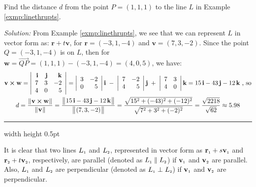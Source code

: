 \begin{exmp}
 Find the distance $d$ from the point $P = (1,1,1)$ to the line $L$ in Example \ref{exmp:linethrupts}.\vspace{1mm}
 \par\noindent\emph{Solution:} From Example \ref{exmp:linethrupts}, we see that we can represent $L$ in vector form as:
 $\textbf{r} + t \textbf{v}$, for $\textbf{r} = (-3,1,-4)$ and $\textbf{v} = (7,3,-2)$. Since the point $Q = (-3,1,-4)$
 is on $L$, then for $\textbf{w} = \overrightarrow{QP} = (1,1,1) - (-3,1,-4) = (4,0,5)$, we have:
 \begin{gather*}
  \textbf{v} \bm{\times} \textbf{w} = \left|\begin{array}{rrr}\textbf{i} & \textbf{j} & \textbf{k}\\7 & 3 & -2\\
   4 & 0 & 5\end{array}\right|
   = \left|\begin{array}{rr}3 & -2\\0 & 5\end{array}\right| \textbf{i} \;-\;
     \left|\begin{array}{rr}7 & -2\\4 & 5\end{array}\right| \textbf{j} \;+\;
     \left|\begin{array}{rr}7 & 3\\4 & 0\end{array}\right| \textbf{k}
   = 15\,\textbf{i} - 43\,\textbf{j} - 12\,\textbf{k} \text{~,~so}\\
  d = \frac{\lVert\mspace{1mu}\textbf{v} \bm{\times} \textbf{w}\mspace{1mu}\rVert}{\lVert\mspace{1mu}\textbf{v}\mspace{1mu}\rVert} =
   \frac{\bigl\lVert\mspace{1mu}15\,\textbf{i} - 43\,\textbf{j} - 12\,\textbf{k}\mspace{1mu}\bigr\rVert}{\bigl\lVert\mspace{1mu}(7,3,-2)\mspace{1mu}\bigr\rVert}
  = \frac{\sqrt{15^2 + (-43)^2 + (-12)^2}}{\sqrt{7^2 + 3^2 + (-2)^2}}
  = \frac{\sqrt{2218}}{\sqrt{62}} \approx 5.98
 \end{gather*}
\end{exmp}\vspace{-1mm}
\hrule width \textwidth height 0.5pt
\vspace{2mm}

It is clear that two lines $L_{\scriptscriptstyle 1}$ and $L_{\scriptscriptstyle 2}$, represented in vector form as
$\textbf{r}_{\scriptscriptstyle 1} + s \textbf{v}_{\scriptscriptstyle 1}$ and $\textbf{r}_{\scriptscriptstyle 2} + t \textbf{v}_{\scriptscriptstyle 2}$, respectively, are
parallel (denoted as $L_{\scriptscriptstyle 1} \parallel L_{\scriptscriptstyle 2}$) if $\textbf{v}_{\scriptscriptstyle 1}$ and $\textbf{v}_{\scriptscriptstyle 2}$ are
parallel. Also, $L_{\scriptscriptstyle 1}$ and $L_{\scriptscriptstyle 2}$ are perpendicular (denoted as $L_{\scriptscriptstyle 1} \perp L_{\scriptscriptstyle 2}$) if
$\textbf{v}_{\scriptscriptstyle 1}$ and $\textbf{v}_{\scriptscriptstyle 2}$ are perpendicular.

